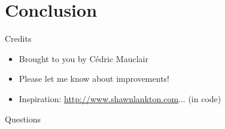 \documentclass[utf8, a4paper, handout]{beamer}
\begin{document}
\section
  {Conclusion}

\begin{frame}
  {Credits}

  \begin{itemize}
  \item Brought to you by Cédric Mauclair
  \item Please let me know about improvements!
  \item Inspiration: \url{http://www.shawnlankton.com}... (in code)
  \end{itemize}
\end{frame}


\begin{frame}
  {Questions}

  \nocite{lorem,ipsum}
  
  

\end{frame}
\end{document}
